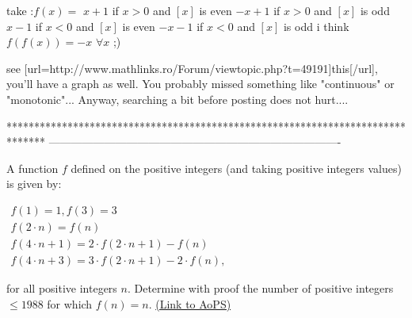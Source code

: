 \begin{mysolution}
	take :$f(x)=$
             $x+1$ if $x>0$ and $[x]$ is even
             $-x+1$ if $x>0$ and $[x]$ is odd 
             $x-1$ if $x<0$ and  $[x]$ is even
             $-x-1$ if $x<0$ and  $[x]$ is odd
i think $f(f(x))=-x$ $\forall x$ ;)
\end{mysolution}



\begin{mysolution}
	see [url=http://www.mathlinks.ro/Forum/viewtopic.php?t=49191]this[/url], you'll have a graph as well.
You probably missed something like "continuous" or "monotonic"...
Anyway, searching a bit before posting does not hurt....
\end{mysolution}
*******************************************************************************
-------------------------------------------------------------------------------

\begin{problem}
	A function $ f$ defined on the positive integers (and taking positive integers values) is given by:

$ \begin{matrix} f(1) = 1, f(3) = 3 \\
f(2 \cdot n) = f(n) \\
f(4 \cdot n + 1) = 2 \cdot f(2 \cdot n + 1) - f(n) \\
f(4 \cdot n + 3) = 3 \cdot f(2 \cdot n + 1) - 2 \cdot f(n), \end{matrix}$

for all positive integers $ n.$ Determine with proof the number of positive integers $ \leq 1988$ for which $ f(n) = n.$
	\flushright \href{https://artofproblemsolving.com/community/c6h60400}{(Link to AoPS)}
\end{problem}



